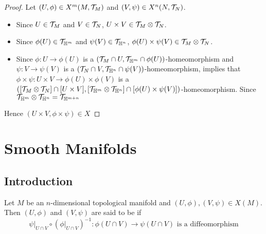 \documentclass{book}
\begin{document}
\begin{proof}
	Let $(U, \phi) \in X^m(M, \mathcal{T}_M)$ and $(V, \psi) \in X^n(N, \mathcal{T}_N)$. 
	\begin{itemize}
		\item Since $U \in \mathcal{T}_M$ and $V \in \mathcal{T}_N$, $U \times V \in \mathcal{T}_M \otimes \mathcal{T}_N$. 
		\item Since $\phi(U) \in \mathcal{T}_{\mathbb{H}^m}$ and $\psi(V) \in \mathcal{T}_{\mathbb{H}^n}$, $\phi(U) \times \psi(V) \in \mathcal{T}_M \otimes \mathcal{T}_N$. 
		\item Since $\phi:U \rightarrow \phi(U)$ is a $(\mathcal{T}_M \cap U, \mathcal{T}_{\mathbb{H}^m} \cap \phi(U))$-homeomorphism and $\psi: V \rightarrow \psi(V)$ is a $(\mathcal{T}_N \cap V, \mathcal{T}_{\mathbb{H}^n} \cap \psi(V))$-homeomorphism,  implies that $\phi \times \psi: U \times V \rightarrow \phi(U) \times \phi(V)$ is a $([\mathcal{T}_M \otimes \mathcal{T}_N] \cap [U \times V], [\mathcal{T}_{\mathbb{H}^m} \otimes \mathcal{T}_{\mathbb{H}^n}] \cap [\phi(U) \times \psi(V)])$-homeomorphism. Since $\mathcal{T}_{\mathbb{H}^m} \otimes \mathcal{T}_{\mathbb{H}^n} = \mathcal{T}_{\mathbb{H}^{m+n}}$
	\end{itemize}
	Hence $(U \times V, \phi \times \psi) \in X^{}$
\end{proof}
	





	
	
	
	
	
	
	
	
	
	
	
	
	\newpage
	
	\chapter{Smooth Manifolds}
	
	\section{Introduction}

	\begin{defn}
		Let $M$ be an $n$-dimensional topological manifold and $(U, \phi), (V, \psi) \in X(M)$. Then $(U, \phi)$ and $(V, \psi)$ are said to be  if $$\psi|_{U \cap V} \circ (\phi|_{U \cap V})^{-1}: \phi(U \cap V) \rightarrow \psi (U \cap V) \text{ is a diffeomorphism}$$ 
	\end{defn}
\end{document}
